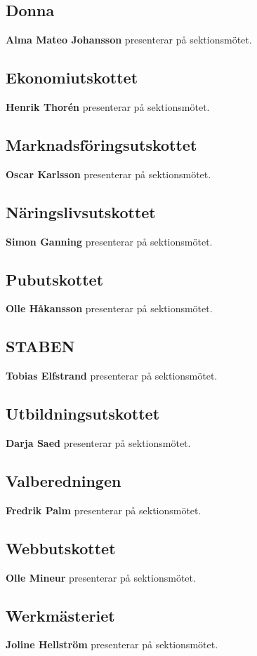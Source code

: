 \documentclass[../protokoll-vintermote-2024.tex]{subfiles}
\begin{document}
\subsection{Donna}
\textbf{Alma Mateo Johansson} presenterar på sektionsmötet.


\subsection{Ekonomiutskottet}
\textbf{Henrik Thorén} presenterar på sektionsmötet.


\subsection{Marknadsföringsutskottet}
\textbf{Oscar Karlsson} presenterar på sektionsmötet.


\subsection{Näringslivsutskottet}
\textbf{Simon Ganning} presenterar på sektionsmötet.


\subsection{Pubutskottet}
\textbf{Olle Håkansson} presenterar på sektionsmötet.


\subsection{STABEN}
\textbf{Tobias Elfstrand} presenterar på sektionsmötet.


\subsection{Utbildningsutskottet}
\textbf{Darja Saed} presenterar på sektionsmötet. 

 
\subsection{Valberedningen}
\textbf{Fredrik Palm} presenterar på sektionsmötet.


\subsection{Webbutskottet}
\textbf{Olle Mineur} presenterar på sektionsmötet.


\subsection{Werkmästeriet}
\textbf{Joline Hellström} presenterar på sektionsmötet.
\end{document}
